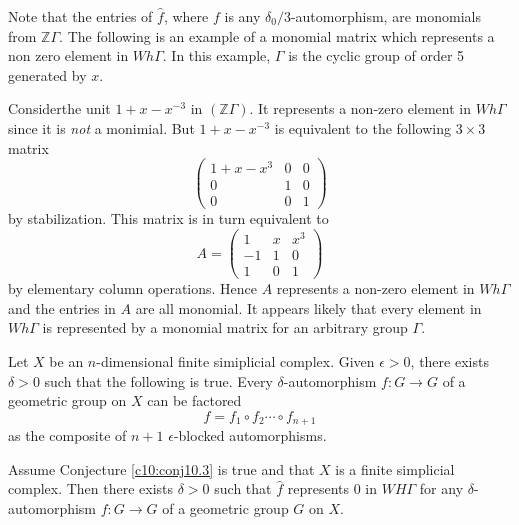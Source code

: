 \begin{remark*}
  Note that the entries of $\hat{f}$, where $f$ is any
  $\delta_0/3$-automor\-phism, are monomials from
  $\mathbb{Z}\Gamma$. The following is an example of a monomial matrix
  which represents a non zero element in $Wh \Gamma$. In this example,
  $\Gamma$ is the cyclic group of order 5 generated by  $x$. 
\end{remark*}

Consider\pageoriginale the unit $1+ x - x^{-3}$ in 
$(\mathbb{Z}\Gamma)$. It represents a non-zero element in $Wh\Gamma$
since it is \textit{not} a monimial. But $1+ x- x^{-3}$ is equivalent
to the following $3 \times 3$ matrix 
$$
\begin{pmatrix}
  1+ x- x^{3} & 0 & 0\\
  0 & 1 & 0\\
  0 & 0 & 1
\end{pmatrix}
$$
by stabilization. This matrix is in turn equivalent to 
$$
A= 
\begin{pmatrix}
  1 & x & x^3\\
  -1 & 1 &0\\
  1 & 0 & 1
\end{pmatrix}
$$
by elementary column operations. Hence $A$ represents a non-zero
element in $Wh \Gamma$ and the entries in $A$ are all monomial. It
appears likely that every element in $Wh \Gamma$ is represented by a
monomial matrix for an arbitrary group $\Gamma$.

\begin{conj}\label{c10:conj10.3}
  Let $X$ be an $n$-dimensio\-nal finite simiplicial complex. Given
  $\epsilon > 0$, there exists $\delta> 0$ such that the following is
  true. Every $\delta$-automorphism $f: G \to G$ of a geometric group
  on $X$ can be factored
  $$
  f= f_1 \circ f_2 \cdots \circ f_{n+1}
  $$
  as the composite of $n+1$ $\epsilon$-blocked automorphisms.
\end{conj}

\begin{lemma}\label{c10:lem10.4}
  Assume Conjecture \ref{c10:conj10.3} is true and that $X$ is a
  finite simplicial complex. Then there exists $\delta> 0$ such that
  $\hat{f}$ represents 0 in $WH\Gamma$ for any $\delta$-automorphism
  $f:G \to G$ of a geometric group $G$ on $X$.
\end{lemma}

